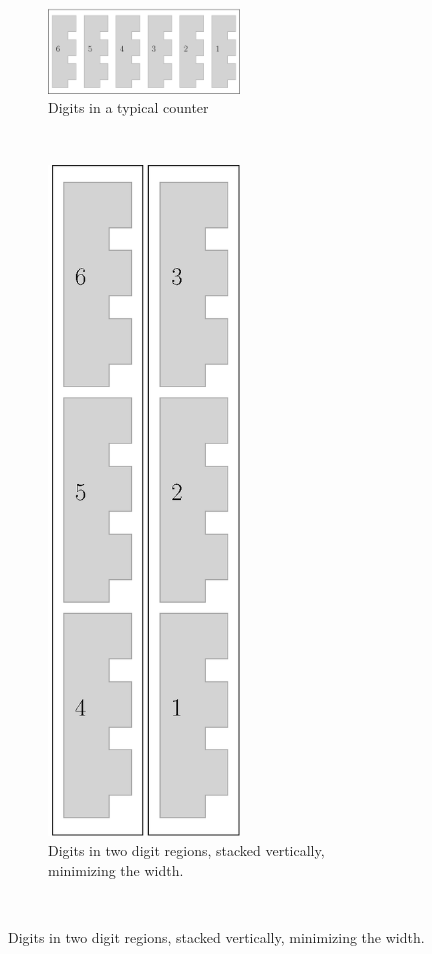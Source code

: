 \begin{figure}[H]
    \centering
    \begin{subfigure}[t]{0.43\textwidth}
        \centering
        \includegraphics[width=2in]{digits_normal_counter}
        \caption{\label{fig:digits_normal_counter} Digits in a typical counter}
    \end{subfigure}%
    ~
    \begin{subfigure}[t]{0.43\textwidth}
        \centering
        \includegraphics[width=2in]{digits_digit_region_counter}
        \caption{\label{fig:digits_digit_region_counter} Digits in two digit regions, stacked vertically, minimizing the width. }
    \end{subfigure}%
    ~
\end{figure}

